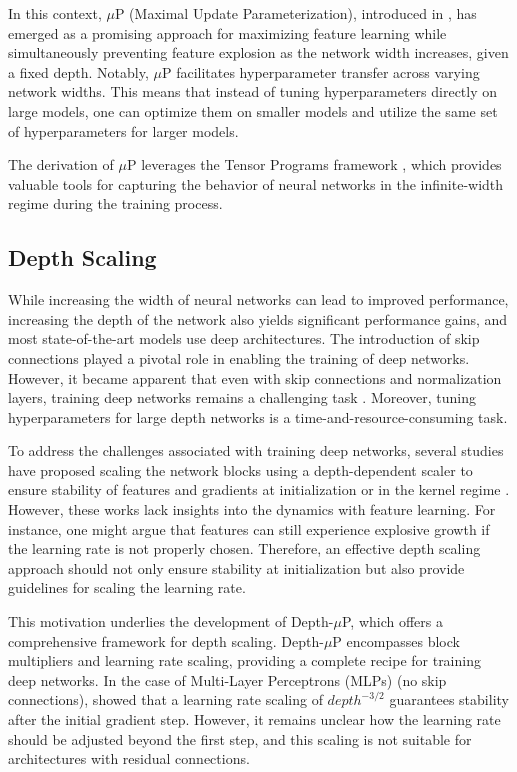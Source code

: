\documentclass{article}
\theoremstyle{plain}
\theoremstyle{definition}
\begin{document}
In this context, $\mu$P (Maximal Update Parameterization), introduced in \cite{yang2022tensor}, has emerged as a promising approach for maximizing feature learning while simultaneously preventing feature explosion as the network width increases, given a fixed depth. Notably, $\mu$P facilitates hyperparameter transfer across varying network widths. This means that instead of tuning hyperparameters directly on large models, one can optimize them on smaller models and utilize the same set of hyperparameters for larger models.

The derivation of $\mu$P leverages the Tensor Programs framework \citep{yang2021tensor_i, yang2020scaling, yang2020tensor, yang2021tensor, yang2022tensor}, which provides valuable tools for capturing the behavior of neural networks in the infinite-width regime during the training process. 

\subsection{Depth Scaling} 
While increasing the width of neural networks can lead to improved performance, increasing the depth of the network also yields significant performance gains, and most state-of-the-art models use deep architectures. The introduction of skip connections \citep{he2016deep, he2016identity} played a pivotal role in enabling the training of deep networks. However, it became apparent that even with skip connections and normalization layers, training deep networks remains a challenging task \citep{liu2020understanding}. Moreover, tuning hyperparameters for large depth networks is a time-and-resource-consuming task.

To address the challenges associated with training deep networks, several studies have proposed scaling the network blocks using a depth-dependent scaler to ensure stability of features and gradients at initialization or in the kernel regime \citep{hayou21stable, hanin2018start, zhang2019fixup, noci2022signal, hayou2023infinitedepth, hayou2023width, noci2023shaped,zhang2023stabilize}. However, these works lack insights into the dynamics with feature learning. For instance, one might argue that features can still experience explosive growth if the learning rate is not properly chosen. Therefore, an effective depth scaling approach should not only ensure stability at initialization but also provide guidelines for scaling the learning rate.

This motivation underlies the development of Depth-$\mu$P, which offers a comprehensive framework for depth scaling. Depth-$\mu$P encompasses block multipliers and learning rate scaling, providing a complete recipe for training deep networks. In the case of Multi-Layer Perceptrons (MLPs) (no skip connections), \citet{jelassi2023depth} showed that a learning rate scaling of $depth^{-3/2}$ guarantees stability after the initial gradient step. However, it remains unclear how the learning rate should be adjusted beyond the first step, and this scaling is not suitable for architectures with residual connections.
\end{document}
